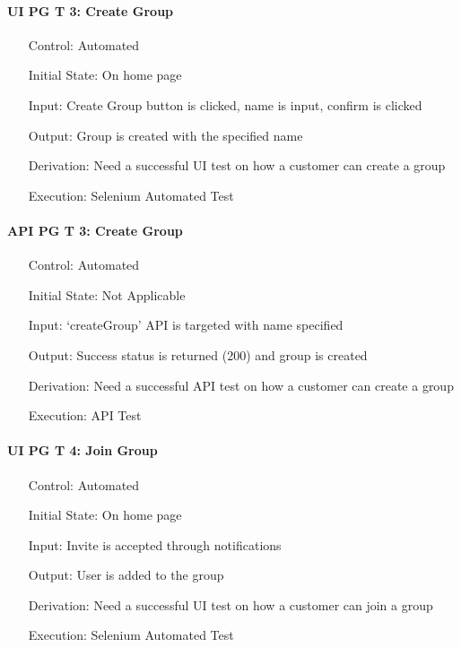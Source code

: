 \documentclass[12pt, titlepage]{article}
\begin{document}
\paragraph*{UI PG T 3: Create Group}
\begin{itemize}
	\item[Control:] Automated
	\item[Initial State:] On home page
	\item[Input:] Create Group button is clicked, name is input, confirm is clicked
	\item[Output:] Group is created with the specified name
	\item[Derivation:] Need a successful UI test on how a customer can create a group
	\item[Execution:] Selenium Automated Test
\end{itemize}

\paragraph*{API PG T 3: Create Group}
\begin{itemize}
	\item[Control:] Automated
	\item[Initial State:] Not Applicable
	\item[Input:] `createGroup' API is targeted with name specified
	\item[Output:] Success status is returned (200) and group is created
	\item[Derivation:] Need a successful API test on how a customer can create a group
	\item[Execution:] API Test
\end{itemize}

\paragraph*{UI PG T 4: Join Group}
\begin{itemize}
	\item[Control:] Automated
	\item[Initial State:] On home page
	\item[Input:] Invite is accepted through notifications
	\item[Output:] User is added to the group
	\item[Derivation:] Need a successful UI test on how a customer can join a group
	\item[Execution:] Selenium Automated Test
\end{itemize}
\end{document}
